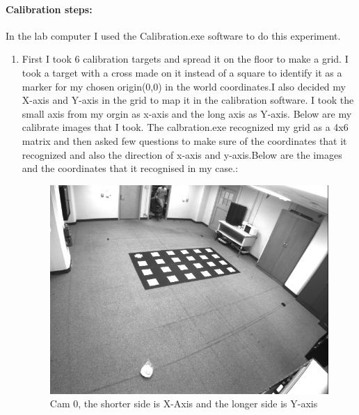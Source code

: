 \documentclass{article}
\begin{document}
\paragraph{Calibration steps:}
In the lab computer I used the Calibration.exe software to do this experiment. 
\begin{enumerate}
\item First I took 6 calibration targets and spread it on the floor to make a grid. I took a target with a cross made on it instead of a square to identify it as a marker for my chosen origin(0,0) in the world coordinates.I also decided my X-axis and Y-axis in the grid to map it in the calibration software. I took the small axis from my orgin as x-axis and the long axis as Y-axis. Below are my calibrate images that I took. The calbration.exe recognized my grid as a 4x6 matrix and then asked few questions to make sure of the coordinates that it recognized and also the direction of x-axis and y-axis.Below are the images and the coordinates that it recognised in my case.:
\begin{figure}[!htb]
    \centering
  		\includegraphics[scale=0.6]{CalImage_0.png}
  		\caption{Cam 0, the shorter side is X-Axis and the longer side is Y-axis}
  		\label{Fig1}
 \end{figure}


\end{enumerate}
\end{document}
